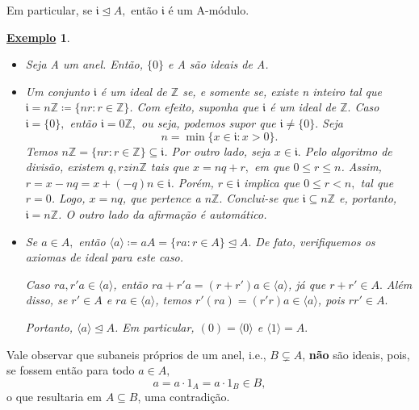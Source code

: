 \documentclass{article}
\newtheorem{example}{\underline{Exemplo}}
\begin{document}
Em particular, se \(\mathfrak{i} \trianglelefteq{A},\) então \(\mathfrak{i}\) é um A-módulo.
\begin{example}
  \begin{itemize}
    \item[i)] Seja A um anel. Então, \(\{0\}\) e A são ideais de A. 
    \item[ii)] Um conjunto \(\mathfrak{i}\) é um ideal de \(\mathbb{Z}\) se, e somente se, existe n inteiro tal que \(\mathfrak{i} = n \mathbb{Z}\coloneqq \{nr:r\in \mathbb{Z}\}\).
Com efeito, suponha que \(\mathfrak{i}\) é um ideal de \(\mathbb{Z}.\) Caso \(\mathfrak{i} = \{0\},\) então \(\mathfrak{i} = 0 \mathbb{Z},\) ou seja, podemos supor que \(\mathfrak{i}\neq \{0\}.\) Seja 
  \[
    n = \min\{x\in \mathfrak{i}: x > 0\}.
  \]
  Temos \(n \mathbb{Z} = \{nr:r\in \mathbb{Z}\}\subseteq \mathfrak{i}\). Por outro lado, seja \(x\in \mathfrak{i}.\) Pelo algoritmo de divisão, existem
 \(q, rzin \mathbb{Z}\) tais que \(x = nq + r,\) em que \( 0 \leq r \leq n\). Assim, \(r = x-nq = x + (-q)n\in \mathfrak{i}\).
 Porém, \(r\in \mathfrak{i}\) implica que \(0\leq r < n,\) tal que \( r = 0\). Logo,
 \(x = nq \), que pertence a \(n \mathbb{Z}.\) Conclui-se que \(\mathfrak{i}\subseteq n \mathbb{Z}\) e, portanto, \(\mathfrak{i} = n \mathbb{Z}\). O outro lado da 
 afirmação é automático.
    \item[iii)] Se \(a\in A,\) então \(\langle a \rangle\coloneqq aA = \{ra: r\in A\}\trianglelefteq{A}.\) De fato,
      verifiquemos os axiomas de ideal para este caso.

      Caso \(ra, r'a\in \langle a \rangle\), então \(ra + r'a = (r+r')a\in \langle a \rangle\), já que \(r + r'\in A.\)
      Além disso, se \(r'\in A\) e \(ra\in \langle a \rangle\), temos \(r'(ra) = (r'r)a\in \langle a \rangle\), pois \(rr'\in A.\)

      Portanto, \(\langle a \rangle \trianglelefteq{A}\). Em particular, \((0) = \langle 0 \rangle\) e \(\langle 1 \rangle = A.\)
  \end{itemize}
\end{example}
  Vale observar que subaneis próprios de um anel, i.e., \(B\subsetneq A\), \textbf{não} são ideais, pois, se fossem então para todo \(a\in A,\) 
    \[
      a = a \cdot 1_{A} = a \cdot 1_{B}\in B,
    \]
  o que resultaria em \(A\subseteq B\), uma contradição.
\end{document}
